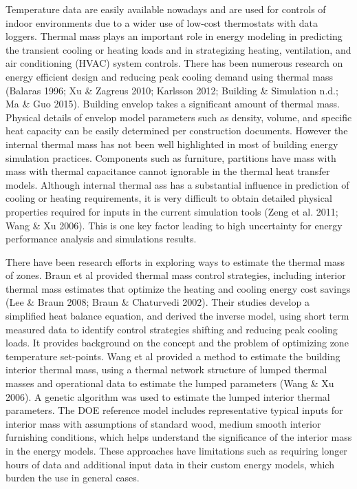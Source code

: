 Temperature data are easily available nowadays and are used for controls of indoor environments due to a wider use of low-cost thermostats with data loggers. Thermal mass plays an important role in energy modeling in predicting the transient cooling or heating loads and in strategizing heating, ventilation, and air conditioning (HVAC) system controls. There has been numerous research on energy efficient design and reducing peak cooling demand using thermal mass  (Balaras 1996; Xu \& Zagreus 2010; Karlsson 2012; Building \& Simulation n.d.; Ma \& Guo 2015). Building envelop takes a significant amount of thermal mass. Physical details of envelop model parameters such as density, volume, and specific heat capacity can be easily determined per construction documents. However the internal thermal mass has not been well highlighted in most of building energy simulation practices. Components such as furniture, partitions have mass with mass with thermal capacitance cannot ignorable in the thermal heat transfer models. Although internal thermal ass has a substantial influence in prediction of cooling or heating requirements, it is very difficult to obtain detailed physical properties required for inputs in the current simulation tools (Zeng et al. 2011; Wang \& Xu 2006). This is one key factor leading to high uncertainty for energy performance analysis and simulations results.

There have been research efforts in exploring ways to estimate the thermal mass of zones. Braun et al provided thermal mass control strategies, including interior thermal mass estimates that optimize the heating and cooling energy cost savings (Lee \& Braun 2008; Braun \& Chaturvedi 2002). Their studies develop a simplified heat balance equation, and derived the inverse model, using short term measured data to identify control strategies shifting and reducing peak cooling loads. It provides background on the concept and the problem of optimizing zone temperature set-points. Wang et al provided a method to estimate the building interior thermal mass, using a thermal network structure of lumped thermal masses and operational data to estimate the lumped parameters (Wang \& Xu 2006). A genetic algorithm was used to estimate the lumped interior thermal parameters. The DOE reference model includes representative typical inputs for interior mass with assumptions of standard wood, medium smooth interior furnishing conditions, which helps understand the significance of the interior mass in the energy models. These approaches have limitations such as requiring longer hours of data and additional input data in their custom energy models, which burden the use in general cases.

